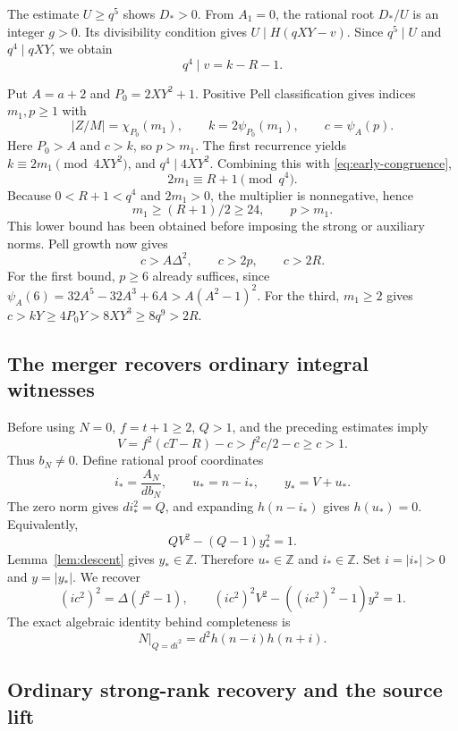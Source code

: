 \documentclass[11pt]{article}
\theoremstyle{definition}
\theoremstyle{remark}
\newcommand{\Z}{\mathbb Z}
\begin{document}
The estimate $U\ge q^5$ shows $D_*>0$. From $A_1=0$, the rational root
$D_*/U$ is an integer $g>0$. Its divisibility condition gives
$U\mid H(qXY-v)$. Since $q^5\mid U$ and $q^4\mid qXY$, we obtain
\begin{equation}\label{eq:early-congruence}
 q^4\mid v=k-R-1.
\end{equation}

Put $A=a+2$ and $P_0=2XY^2+1$. Positive Pell classification gives
indices $m_1,p\ge1$ with
\[
 |Z/M|=\chi_{P_0}(m_1),\qquad
 k=2\psi_{P_0}(m_1),\qquad c=\psi_A(p).
\]
Here $P_0>A$ and $c>k$, so $p>m_1$. The first recurrence yields
$k\equiv2m_1\pmod{4XY^2}$, and $q^4\mid4XY^2$. Combining this with
\eqref{eq:early-congruence},
\[
 2m_1\equiv R+1\pmod{q^4}.
\]
Because $0<R+1<q^4$ and $2m_1>0$, the multiplier is nonnegative, hence
\begin{equation}\label{eq:index-lower}
 m_1\ge(R+1)/2\ge24,\qquad p>m_1.
\end{equation}
This lower bound has been obtained before imposing the strong or auxiliary
norms. Pell growth now gives
\[
 c>A\Delta^2,\qquad c>2p,\qquad c>2R.
\]
For the first bound, $p\ge6$ already suffices, since
$\psi_A(6)=32A^5-32A^3+6A>A(A^2-1)^2$. For the third, $m_1\ge2$ gives
$c>kY\ge4P_0Y>8XY^3\ge8q^9>2R$.

\subsection{The merger recovers ordinary integral witnesses}

Before using $N=0$, $f=t+1\ge2$, $Q>1$, and the preceding estimates imply
\[
 V=f^2(cT-R)-c>f^2c/2-c\ge c>1.
\]
Thus $b_N\ne0$. Define rational proof coordinates
\[
 i_*=\frac{A_N}{db_N},\qquad u_*=n-i_*,\qquad y_*=V+u_*.
\]
The zero norm gives $d i_*^2=Q$, and expanding $h(n-i_*)$ gives
$h(u_*)=0$. Equivalently,
\[
 QV^2-(Q-1)y_*^2=1.
\]
Lemma~\ref{lem:descent} gives $y_*\in\Z$. Therefore $u_*\in\Z$ and
$i_*\in\Z$. Set $i=|i_*|>0$ and $y=|y_*|$. We recover
\begin{equation}\label{eq:ordinary-recovered}
 (ic^2)^2=\Delta(f^2-1),\qquad
 (ic^2)^2V^2-((ic^2)^2-1)y^2=1.
\end{equation}
The exact algebraic identity behind completeness is
\begin{equation}\label{eq:ordinary-factorization}
 N\big|_{Q=di^2}=d^2h(n-i)h(n+i).
\end{equation}

\subsection{Ordinary strong-rank recovery and the source lift}
\end{document}

